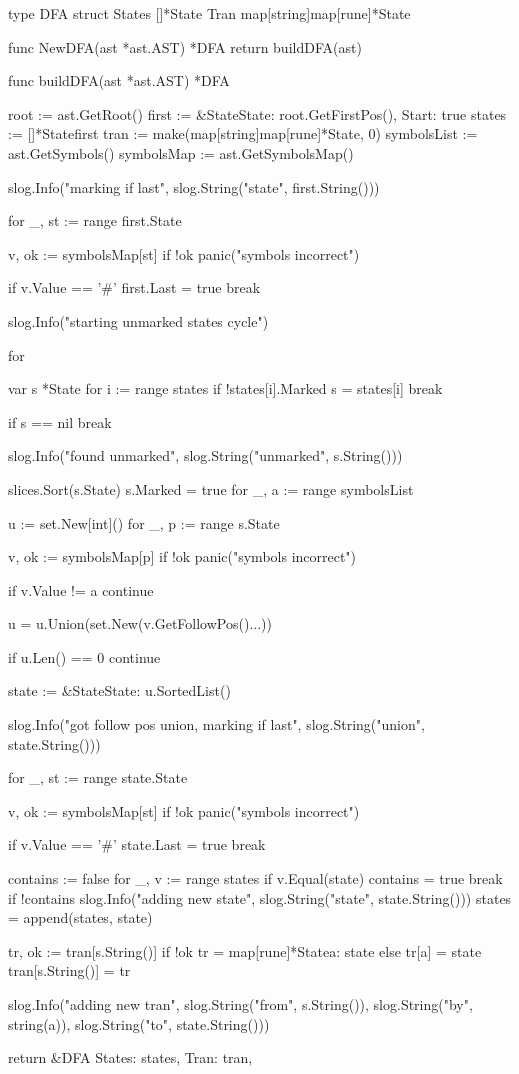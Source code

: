 type DFA struct {
	States []*State
	Tran   map[string]map[rune]*State
}

func NewDFA(ast *ast.AST) *DFA {
	return buildDFA(ast)
}

func buildDFA(ast *ast.AST) *DFA {
	root := ast.GetRoot()
	first := &State{State: root.GetFirstPos(), Start: true}
	states := []*State{first}
	tran := make(map[string]map[rune]*State, 0)
	symbolsList := ast.GetSymbols()
	symbolsMap := ast.GetSymbolsMap()

	slog.Info("marking if last", slog.String("state", first.String()))

	for _, st := range first.State {
		v, ok := symbolsMap[st]
		if !ok {
			panic("symbols incorrect")
		}

		if v.Value == '#' {
			first.Last = true
			break
		}
	}

	slog.Info("starting unmarked states cycle")

	for {
		var s *State
		for i := range states {
			if !states[i].Marked {
				s = states[i]
				break
			}
		}

		if s == nil {
			break
		}

		slog.Info("found unmarked", slog.String("unmarked", s.String()))

		slices.Sort(s.State)
		s.Marked = true
		for _, a := range symbolsList {
			u := set.New[int]()
			for _, p := range s.State {
				v, ok := symbolsMap[p]
				if !ok {
					panic("symbols incorrect")
				}

				if v.Value != a {
					continue
				}

				u = u.Union(set.New(v.GetFollowPos()...))
			}

			if u.Len() == 0 {
				continue
			}

			state := &State{State: u.SortedList()}

			slog.Info("got follow pos union, marking if last", slog.String("union", state.String()))

			for _, st := range state.State {
				v, ok := symbolsMap[st]
				if !ok {
					panic("symbols incorrect")
				}

				if v.Value == '#' {
					state.Last = true
					break
				}
			}

			contains := false
			for _, v := range states {
				if v.Equal(state) {
					contains = true
					break
				}
			}
			if !contains {
				slog.Info("adding new state", slog.String("state", state.String()))
				states = append(states, state)
			}

			tr, ok := tran[s.String()]
			if !ok {
				tr = map[rune]*State{a: state}
			} else {
				tr[a] = state
			}
			tran[s.String()] = tr

			slog.Info("adding new tran", slog.String("from", s.String()), slog.String("by", string(a)), slog.String("to", state.String()))
		}
	}

	return &DFA{
		States: states,
		Tran:   tran,
	}
}

